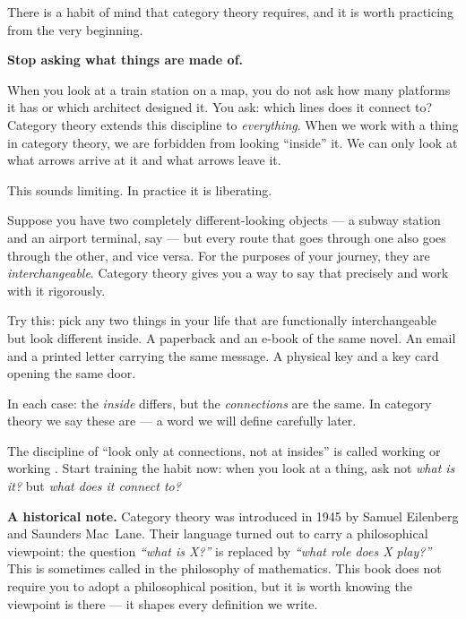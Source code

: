 There is a habit of mind that category theory requires, and it is worth
practicing from the very beginning.

\textbf{Stop asking what things are made of.}

When you look at a train station on a map, you do not ask how many platforms
it has or which architect designed it. You ask: which lines does it connect to?
Category theory extends this discipline to \emph{everything}. When we work
with a thing in category theory, we are forbidden from looking ``inside'' it.
We can only look at what arrows arrive at it and what arrows leave it.

This sounds limiting. In practice it is liberating.

Suppose you have two completely different-looking objects --- a subway station
and an airport terminal, say --- but every route that goes through one also
goes through the other, and vice versa. For the purposes of your journey, they
are \emph{interchangeable}. Category theory gives you a way to say that
precisely and work with it rigorously.

\begin{readernote}
Try this: pick any two things in your life that are functionally
interchangeable but look different inside. A paperback and an e-book of the
same novel. An email and a printed letter carrying the same message. A
physical key and a key card opening the same door.

In each case: the \emph{inside} differs, but the \emph{connections} are the
same. In category theory we say these are  --- a word we will
define carefully later.
\end{readernote}

The discipline of ``look only at connections, not at insides'' is called
working  or working . Start training
the habit now: when you look at a thing, ask not \emph{what is it?} but
\emph{what does it connect to?}

\medskip

\textbf{A historical note.} Category theory was introduced in 1945 by Samuel
Eilenberg and Saunders Mac~Lane. Their language turned out to carry a
philosophical viewpoint: the question \emph{``what is X?''} is replaced by
\emph{``what role does X play?''} This is sometimes called 
in the philosophy of mathematics. This book does not require you to adopt a
philosophical position, but it is worth knowing the viewpoint is there --- it
shapes every definition we write.


